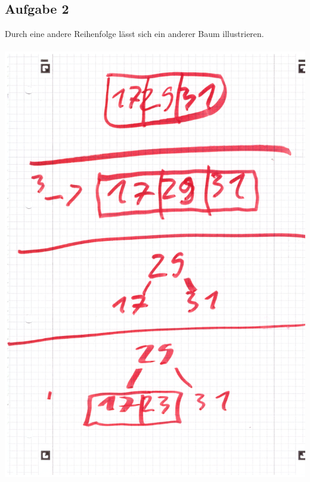 \documentclass{article}
\begin{document}
	\subsection*{Aufgabe 2}
	Durch eine andere Reihenfolge lässt sich ein anderer Baum illustrieren. \\
	\\
	\includegraphics[width=\linewidth]{A10201} \\ \\
\end{document}
